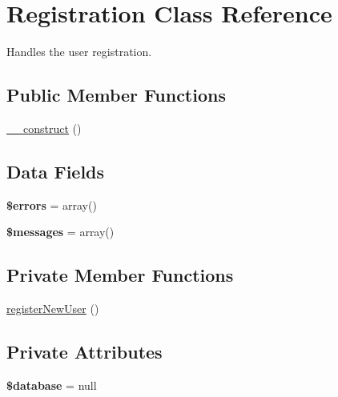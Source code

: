 \hypertarget{class_registration}{\section{\-Registration \-Class \-Reference}
\label{class_registration}
}


\-Handles the user registration.  


\subsection*{\-Public \-Member \-Functions}
\begin{DoxyCompactItemize}
\item 
\hyperlink{class_registration_a095c5d389db211932136b53f25f39685}{\-\_\-\-\_\-construct} ()
\end{DoxyCompactItemize}
\subsection*{\-Data \-Fields}
\begin{DoxyCompactItemize}
\item 
\hypertarget{class_registration_ab24faf4aa647cdcee494fc48524ad4ff}{{\bfseries \$errors} = array()}\label{class_registration_ab24faf4aa647cdcee494fc48524ad4ff}

\item 
\hypertarget{class_registration_a21a183f927a6d243fe6b4ba3a6c4d4c8}{{\bfseries \$messages} = array()}\label{class_registration_a21a183f927a6d243fe6b4ba3a6c4d4c8}

\end{DoxyCompactItemize}
\subsection*{\-Private \-Member \-Functions}
\begin{DoxyCompactItemize}
\item 
\hyperlink{class_registration_a5e4143fb94f6541b6b88503a9905d4e5}{register\-New\-User} ()
\end{DoxyCompactItemize}
\subsection*{\-Private \-Attributes}
\begin{DoxyCompactItemize}
\item 
\hypertarget{class_registration_a7691c0162d89de0b6ba47edcd8ba8878}{{\bfseries \$database} = null}\label{class_registration_a7691c0162d89de0b6ba47edcd8ba8878}

\end{DoxyCompactItemize}


